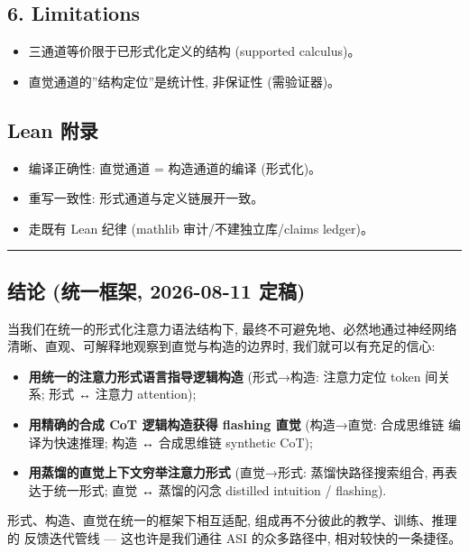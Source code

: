 \documentclass[
]{article}
\providecommand{\tightlist}{%
  \setlength{\itemsep}{0pt}\setlength{\parskip}{0pt}}
\begin{document}
\subsection{6. Limitations}\label{limitations}

\begin{itemize}
\tightlist
\item
  三通道等价限于已形式化定义的结构 (supported calculus)。
\item
  直觉通道的''结构定位''是统计性, 非保证性 (需验证器)。
\end{itemize}

\subsection{Lean 附录}\label{lean-ux9644ux5f55}

\begin{itemize}
\tightlist
\item
  编译正确性: 直觉通道 = 构造通道的编译 (形式化)。
\item
  重写一致性: 形式通道与定义链展开一致。
\item
  走既有 Lean 纪律 (mathlib 审计/不建独立库/claims ledger)。
\end{itemize}

\begin{center}\rule{0.5\linewidth}{0.5pt}\end{center}

\subsection{结论 (统一框架, 2026-08-11
定稿)}\label{ux7ed3ux8bba-ux7edfux4e00ux6846ux67b6-2026-08-11-ux5b9aux7a3f}

当我们在统一的形式化注意力语法结构下, 最终不可避免地、必然地通过神经网络
清晰、直观、可解释地观察到直觉与构造的边界时, 我们就可以有充足的信心:

\begin{itemize}
\tightlist
\item
  \textbf{用统一的注意力形式语言指导逻辑构造} (形式→构造: 注意力定位
  token 间关系; 形式 ↔ 注意力 attention);
\item
  \textbf{用精确的合成 CoT 逻辑构造获得 flashing 直觉} (构造→直觉:
  合成思维链 编译为快速推理; 构造 ↔ 合成思维链 synthetic CoT);
\item
  \textbf{用蒸馏的直觉上下文穷举注意力形式} (直觉→形式:
  蒸馏快路径搜索组合, 再表达于统一形式; 直觉 ↔ 蒸馏的闪念 distilled
  intuition / flashing).
\end{itemize}

形式、构造、直觉在统一的框架下相互适配,
组成再不分彼此的教学、训练、推理的 反馈迭代管线 --- 这也许是我们通往 ASI
的众多路径中, 相对较快的一条捷径。
\end{document}
